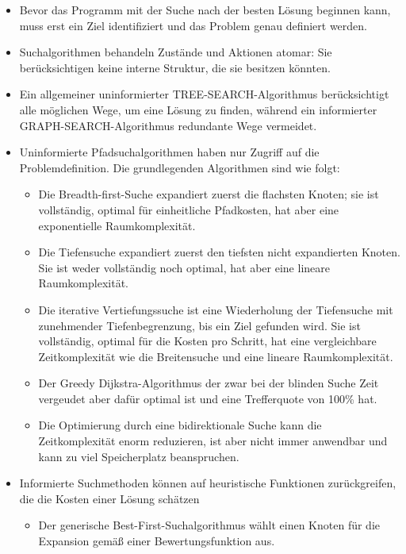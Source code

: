 \begin{itemize}
    \item Bevor das Programm mit der Suche nach der besten Lösung beginnen kann, muss erst ein Ziel identifiziert und das Problem genau definiert werden.
    \item Suchalgorithmen behandeln Zustände und Aktionen atomar: Sie berücksichtigen keine interne Struktur, die sie besitzen könnten.
    \item Ein allgemeiner uninformierter TREE-SEARCH-Algorithmus berücksichtigt alle möglichen Wege, um eine Lösung zu finden, während ein informierter GRAPH-SEARCH-Algorithmus redundante Wege vermeidet.
    \item Uninformierte Pfadsuchalgorithmen haben nur Zugriff auf die Problemdefinition. Die grundlegenden Algorithmen sind wie folgt:
    \begin{itemize}
        \item Die Breadth-first-Suche expandiert zuerst die flachsten Knoten; sie ist vollständig, optimal für einheitliche Pfadkosten, hat aber eine exponentielle Raumkomplexität.
        \item Die Tiefensuche expandiert zuerst den tiefsten nicht expandierten Knoten. Sie ist weder vollständig noch optimal, hat aber eine lineare Raumkomplexität.
        \item Die iterative Vertiefungssuche ist eine Wiederholung der Tiefensuche mit zunehmender Tiefenbegrenzung, bis ein Ziel gefunden wird. Sie ist vollständig, optimal für die Kosten pro Schritt, hat eine vergleichbare Zeitkomplexität wie die Breitensuche und eine lineare Raumkomplexität.
        \item Der Greedy Dijkstra-Algorithmus der zwar bei der blinden Suche Zeit vergeudet aber dafür optimal ist und eine Trefferquote von 100\% hat.
        \item Die Optimierung durch eine bidirektionale Suche kann die Zeitkomplexität enorm reduzieren, ist aber nicht immer anwendbar und kann zu viel Speicherplatz beanspruchen.
    \end{itemize}
    \item Informierte Suchmethoden können auf heuristische Funktionen zurückgreifen, die die Kosten einer Lösung schätzen
    \begin{itemize}
        \item Der generische Best-First-Suchalgorithmus wählt einen Knoten für die Expansion gemäß einer Bewertungsfunktion aus.

\end{itemize}
\end{itemize}
